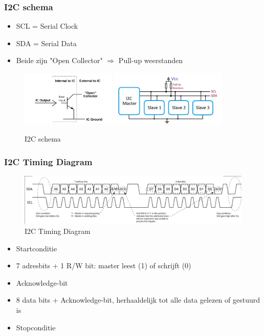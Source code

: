 \documentclass{article}
\begin{document}
\subsubsection{I2C schema}
\begin{itemize}
    \item SCL = Serial Clock
    \item SDA = Serial Data
    \item Beide zijn "Open Collector" $\Rightarrow$ Pull-up weerstanden
\end{itemize}

\begin{figure}[H]
    \includegraphics[width=0.4\textwidth]{Screenshot_20200330_120948.png}
    \includegraphics[width=0.5\textwidth]{Screenshot_20200330_114601.png}
    \caption{I2C schema}
\end{figure}


\subsubsection{I2C Timing Diagram}

\begin{figure}[H]
    \centering
    \includegraphics[width=\textwidth]{Screenshot_20200330_114819.png}
    \caption{I2C Timing Diagram}
\end{figure}

\begin{itemize}
    \item Startconditie
    \item 7 adresbits + 1 R/W bit: master leest (1) of schrijft (0)
    \item Acknowledge-bit
    \item 8 data bits + Acknowledge-bit, herhaaldelijk tot alle data gelezen of gestuurd is
    \item Stopconditie
\end{itemize}
\end{document}
